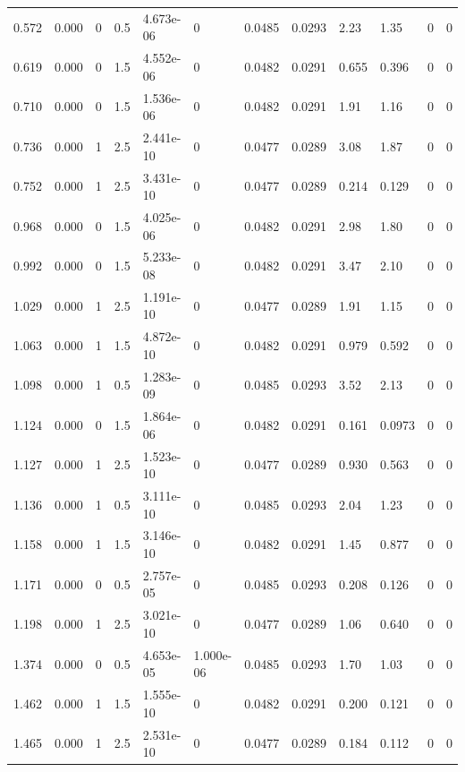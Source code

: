 \documentclass[preview]{standalone}
\begin{document}
{{\begin{tabular}{L{1.2cm}C{1.2cm} C{0.3cm}C{0.5cm} C{1.4cm}C{1.4cm} C{1.4cm}C{1.4cm} C{1.6cm}C{1.6cm} C{1.6cm}C{1.6cm}}
  0.572  &  0.000  & 0     & 0.5 &  4.673e-06  & 0  &  0.0485&   0.0293& 2.23 & 1.35   &  0 & 0  \\ 
  0.619  &  0.000  & 0     & 1.5 &  4.552e-06  & 0  &  0.0482&   0.0291& 0.655 & 0.396   &  0 & 0  \\ 
  0.710  &  0.000  & 0     & 1.5 &  1.536e-06  & 0  &  0.0482&   0.0291& 1.91 & 1.16   &  0 & 0  \\ 
  0.736  &  0.000  & 1     & 2.5 &  2.441e-10  & 0  &  0.0477&   0.0289& 3.08 & 1.87   &  0 & 0  \\ 
  0.752  &  0.000  & 1     & 2.5 &  3.431e-10  & 0  &  0.0477&   0.0289& 0.214 & 0.129   &  0 & 0  \\ 
  0.968  &  0.000  & 0     & 1.5 &  4.025e-06  & 0  &  0.0482&   0.0291& 2.98 & 1.80   &  0 & 0  \\ 
  0.992  &  0.000  & 0     & 1.5 &  5.233e-08  & 0  &  0.0482&   0.0291& 3.47 & 2.10   &  0 & 0  \\ 
  1.029  &  0.000  & 1     & 2.5 &  1.191e-10  & 0  &  0.0477&   0.0289& 1.91 & 1.15   &  0 & 0  \\ 
  1.063  &  0.000  & 1     & 1.5 &  4.872e-10  & 0  &  0.0482&   0.0291& 0.979 & 0.592   &  0 & 0  \\ 
  1.098  &  0.000  & 1     & 0.5 &  1.283e-09  & 0  &  0.0485&   0.0293& 3.52 & 2.13   &  0 & 0  \\ 
  1.124  &  0.000  & 0     & 1.5 &  1.864e-06  & 0  &  0.0482&   0.0291& 0.161 & 0.0973   &  0 & 0  \\ 
  1.127  &  0.000  & 1     & 2.5 &  1.523e-10  & 0  &  0.0477&   0.0289& 0.930 & 0.563   &  0 & 0  \\ 
  1.136  &  0.000  & 1     & 0.5 &  3.111e-10  & 0  &  0.0485&   0.0293& 2.04 & 1.23   &  0 & 0  \\ 
  1.158  &  0.000  & 1     & 1.5 &  3.146e-10  & 0  &  0.0482&   0.0291& 1.45 & 0.877   &  0 & 0  \\ 
  1.171  &  0.000  & 0     & 0.5 &  2.757e-05  & 0  &  0.0485&   0.0293& 0.208 & 0.126   &  0 & 0  \\ 
  1.198  &  0.000  & 1     & 2.5 &  3.021e-10  & 0  &  0.0477&   0.0289& 1.06 & 0.640   &  0 & 0  \\ 
  1.374  &  0.000  & 0     & 0.5 &  4.653e-05  & 1.000e-06  &  0.0485&   0.0293& 1.70 & 1.03   &  0 & 0  \\ 
  1.462  &  0.000  & 1     & 1.5 &  1.555e-10  & 0  &  0.0482&   0.0291& 0.200 & 0.121   &  0 & 0  \\ 
  1.465  &  0.000  & 1     & 2.5 &  2.531e-10  & 0  &  0.0477&   0.0289& 0.184 & 0.112   &  0 & 0  \\ 

\end{tabular}}}
\end{document}
